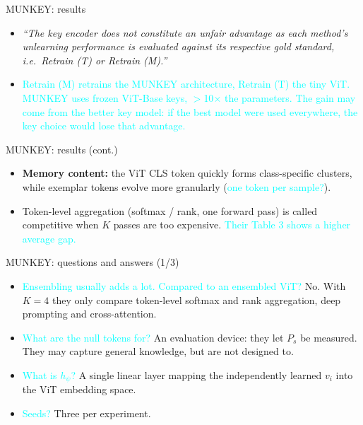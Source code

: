 \documentclass{beamer}
\newcommand{\pierre}[1]{\textcolor{cyan}{#1}}
\begin{document}
\begin{frame}{MUNKEY: results}
\begin{itemize}
  \item \textit{``The key encoder does not constitute an unfair advantage as each
        method's unlearning performance is evaluated against its respective gold
        standard, i.e.\ Retrain (T) or Retrain (M).''}
  \item \pierre{Retrain (M) retrains the MUNKEY architecture, Retrain (T) the
        tiny ViT. MUNKEY uses frozen ViT-Base keys, $>$10$\times$ the parameters.
        The gain may come from the better key model: if the best model were used
        everywhere, the key choice would lose that advantage.}
\end{itemize}
\end{frame}

\begin{frame}{MUNKEY: results (cont.)}
\begin{itemize}
  \item \textbf{Memory content:} the ViT CLS token quickly forms class-specific
        clusters, while exemplar tokens evolve more granularly (\pierre{one token
        per sample?}).
  \item Token-level aggregation (softmax / rank, one forward pass) is called
        competitive when $K$ passes are too expensive.
        \pierre{Their Table 3 shows a higher average gap.}
\end{itemize}
\end{frame}

\begin{frame}{MUNKEY: questions and answers (1/3)}
\begin{itemize}
  \item \pierre{Ensembling usually adds a lot. Compared to an ensembled ViT?}
        No. With $K{=}4$ they only compare token-level softmax and rank
        aggregation, deep prompting and cross-attention.
  \item \pierre{What are the null tokens for?} An evaluation device: they let
        $P_s$ be measured. They may capture general knowledge, but are not
        designed to.
  \item \pierre{What is $h_\psi$?} A single linear layer mapping the
        independently learned $v_i$ into the ViT embedding space.
  \item \pierre{Seeds?} Three per experiment.
\end{itemize}
\end{frame}
\end{document}
